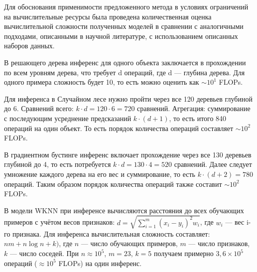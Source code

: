 Для обоснования применимости предложенного метода в условиях ограничений на вычислительные ресурсы была проведена количественная оценка вычислительной сложности полученных моделей в сравнении с аналогичными подходами, описанными в научной литературе, с использованием описанных наборов данных. 

В решающего дерева инференс для одного объекта заключается в прохождении по всем уровням дерева, что требует d операций, где d — глубина дерева. Для одного примера сложность будет 10, то есть можно оценить как $\sim10^1$ FLOPs.

Для инференса в Случайном лесе нужно пройти через все 120 деревьев глубиной до 6. Сравнений всего: $k \cdot d = 120 \cdot 6 = 720$ сравнений. Агрегация: суммирование с последующим усреднение предсказаний $k \cdot (d + 1)$, то есть итого 840 операций на один объект. То есть порядок количества операций составляет $\sim 10^2$ FLOPs.

В градиентном бустинге инференс включает прохождение через все 130 деревьев глубиной до 4, то есть потребуется $k \cdot d = 130 \cdot 4 = 520$ сравнений. Далее следует умножение каждого дерева на его вес и суммирование, то есть $k \cdot (d + 2) = 780$ операций. Таким образом порядок количества операций также составит $\sim 10^2$ FLOPs.


В модели WKNN при инференсе вычисляются расстояния до всех обучающих примеров с учётом весов признаков: $ d = \sqrt{\sum_{i=1}^m (x_i - y_i)^2 w_i}$,
где $w_i$ — вес i-го признака. Для инференса вычислительная сложность составляет:$ nm + n \log n + k)$, где $n$ — число обучающих примеров, $m$ — число признаков, $k$ — число соседей. При $n \approx 10^5$, $m = 23$, $k = 5$ получаем примерно $3,6 \times 10^5$ операций ($\approx10^5$ FLOPs) на один инференс.



